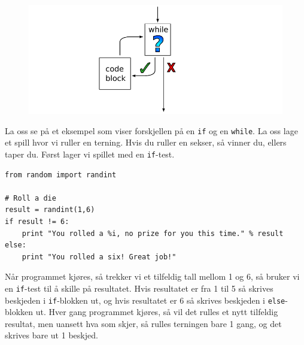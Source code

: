 \documentclass[a4paper, 11pt, notitlepage]{article}
\begin{document}
\begin{figure}[htpb]
\centering
\includegraphics[width=\textwidth]{fig/while_loop.pdf}
\end{figure}

La oss se på et eksempel som viser forskjellen på en \verb+if+ og en \verb+while+. La oss lage et spill hvor vi ruller en terning. Hvis du ruller en sekser, så vinner du, ellers taper du. Først lager vi spillet med en \verb+if+-test.
\begin{lstlisting}
from random import randint

# Roll a die
result = randint(1,6)
if result != 6:
	print "You rolled a %i, no prize for you this time." % result
else:
	print "You rolled a six! Great job!"
\end{lstlisting}
Når programmet kjøres, så trekker vi et tilfeldig tall mellom 1 og 6, så bruker vi en \verb+if+-test til å skille på resultatet. Hvis resultatet er fra 1 til 5 så skrives beskjeden i \verb+if+-blokken ut, og hvis resultatet er 6 så skrives beskjeden i \verb+else+-blokken ut. Hver gang programmet kjøres, så vil det rulles et nytt tilfeldig resultat, men uansett hva som skjer, så rulles terningen bare 1 gang, og det skrives bare ut 1 beskjed.
\end{document}
